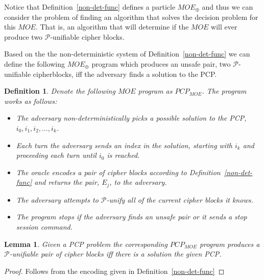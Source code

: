 \documentclass[11pt,twoside,a4paper]{article}
\newtheorem{definition}{Definition}
\newtheorem{lemma}{Lemma}
\begin{document}
Notice that Definition~\ref{non-det-func} defines a 
particle $MOE_{\oplus}$ and thus we can consider the problem 
of finding an algorithm that solves the decision problem for
this $MOE$. That is, an algorithm that will determine if 
the $MOE$ will ever produce two $\mathcal{P}$-unifiable
cipher blocks.

Based on the the non-deterministic system of 
Definition~\ref{non-det-func} we can define the following
$MOE_{\oplus}$ program which produces an unsafe pair, 
two $\mathcal{P}$-unifiable cipherblocks, iff the adversary
finds a solution to the PCP.

\begin{definition}
Denote the following $MOE$ program as $PCP_{MOE}$.
The program works as follows:
\begin{itemize}
	\item The adversary non-deterministically picks a possible
	solution to the PCP, $i_0, i_1, i_2, \ldots, i_k$.
	\item Each turn the adversary sends an index in the solution, 
	starting with $i_k$ and proceeding each turn until $i_0$ 
	is reached. 
	\item The oracle encodes a pair of cipher blocks according 
	to Definition~\ref{non-det-func} and returns the pair,
	$E_j$, to the adversary.
	\item The adversary attempts to $\mathcal{P}$-unify 
	all of the current cipher blocks it knows. 
	\item The program stops if the adversary finds an unsafe
	pair or it sends a stop session command.
\end{itemize}
\end{definition}

\begin{lemma}\label{lemma:pcp_to_moe}
Given a PCP problem the corresponding $PCP_{MOE}$ program 
produces a $\mathcal{P}$-unifiable pair of cipher blocks
iff there is a solution the given PCP. 
\end{lemma}
\begin{proof}
Follows from the encoding given in Definition~\ref{non-det-func}
\end{proof}
\end{document}
